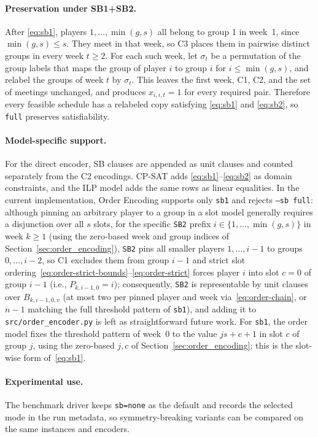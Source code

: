 \documentclass[a4paper,fleqn]{cas-sc}
\begin{document}
\paragraph{Preservation under SB1+SB2.}
After \eqref{eq:sb1}, players $1,\ldots,\min(g,s)$ all belong to group
1 in week~1, since $\min(g,s)\le s$. They meet in that week, so C3
places them in pairwise distinct groups in every week $t\ge2$. For each
such week, let $\sigma_t$ be a permutation of the group labels that maps
the group of player $i$ to group $i$ for $i\le\min(g,s)$, and relabel
the groups of week $t$ by $\sigma_t$. This leaves the first week, C1,
C2, and the set of meetings unchanged, and produces $x_{i,i,t}=1$ for
every required pair. Therefore every feasible schedule has a relabeled
copy satisfying \eqref{eq:sb1} and \eqref{eq:sb2}, so \texttt{full}
preserves satisfiability.

\paragraph{Model-specific support.}
For the direct encoder, SB clauses are appended as unit clauses and
counted separately from the C2 encodings. CP-SAT adds
\eqref{eq:sb1}--\eqref{eq:sb2} as domain constraints, and the ILP model
adds the same rows as linear equalities. In the current implementation,
Order Encoding supports only \texttt{sb1} and rejects \texttt{--sb full}:
although pinning an arbitrary player to a group in a slot model generally
requires a disjunction over all $s$ slots, for the specific \texttt{SB2}
prefix $i\in\{1,\ldots,\min(g,s)\}$ in week $k\ge 1$ (using the
zero-based week and group indices of Section~\ref{sec:order_encoding}),
\texttt{SB2} pins all smaller players $1,\ldots,i-1$ to groups
$0,\ldots,i-2$, so C1 excludes them from group $i-1$ and strict slot
ordering~\eqref{eq:order-strict-bounds}--\eqref{eq:order-strict} forces
player $i$ into slot $c=0$ of group $i-1$ (i.e., $P_{k,i-1,0}=i$);
consequently, \texttt{SB2} is representable by unit clauses over
$B_{k,i-1,0,v}$ (at most two per pinned player and week via~\eqref{eq:order-chain},
or $n-1$ matching the full threshold pattern of \texttt{sb1}), and adding it
to \texttt{src/order\_encoder.py} is left as straightforward future work.
For \texttt{sb1}, the order model fixes the threshold pattern of week~0
to the value $js+c+1$ in slot $c$ of group $j$, using the zero-based
$j,c$ of Section~\ref{sec:order_encoding}; this is the slot-wise form of~\eqref{eq:sb1}.

\paragraph{Experimental use.}
The benchmark driver keeps \texttt{sb=none} as the default and records
the selected mode in the run metadata, so symmetry-breaking variants can
be compared on the same instances and encoders.
\end{document}
